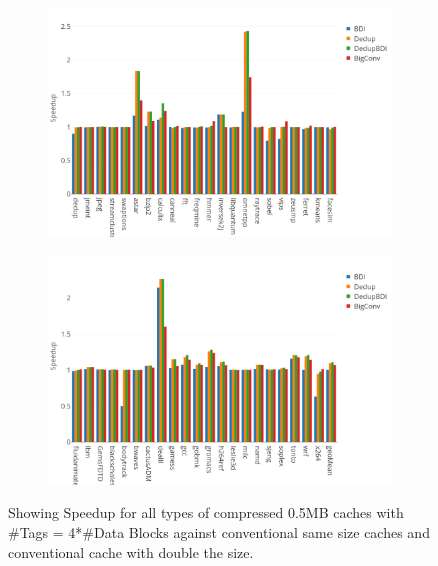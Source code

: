 \begin{figure}
    \begin{subfigure}{\textwidth}
        \includegraphics[width=\textwidth]{all5-speedup1.png}
    \end{subfigure}
    \begin{subfigure}{\textwidth}
        \includegraphics[width=\textwidth]{all5-speedup2.png}
    \end{subfigure}
    \caption[All benchmarks: 0.5MB Speedup]{Showing Speedup for all types of compressed 0.5MB caches with \#Tags = 4*\#Data Blocks against conventional same size caches and conventional cache with double the size.}
    \label{fig:all_speedup1}
\end{figure}

